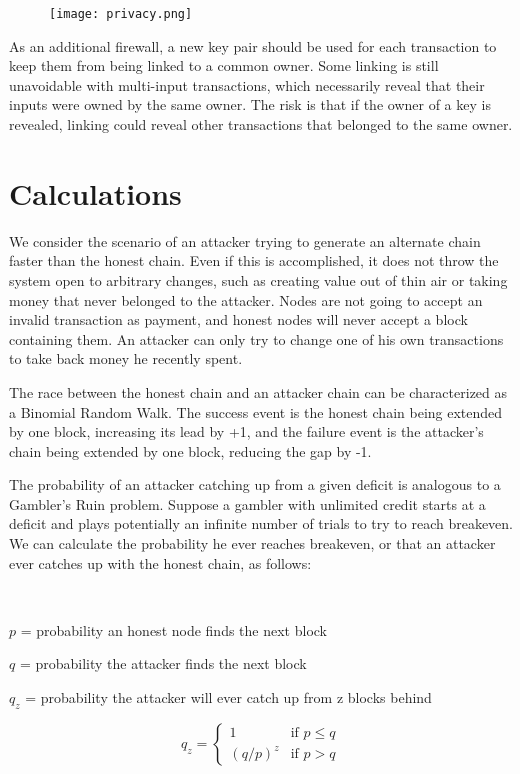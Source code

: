 \documentclass[a4paper, 10pt]{article}
\begin{document}
\begin{figure}[!h]
\centering
\texttt{[image: privacy.png]}
\end{figure}

As an additional firewall, a new key pair should be used for each
transaction to keep them from being linked to a common owner. Some
linking is still unavoidable with multi-input transactions, which
necessarily reveal that their inputs were owned by the same owner. The
risk is that if the owner of a key is revealed, linking could reveal
other transactions that belonged to the same owner.

\section{Calculations}\label{calculations}

We consider the scenario of an attacker trying to generate an alternate
chain faster than the honest chain. Even if this is accomplished, it
does not throw the system open to arbitrary changes, such as creating
value out of thin air or taking money that never belonged to the
attacker. Nodes are not going to accept an invalid transaction as
payment, and honest nodes will never accept a block containing them. An
attacker can only try to change one of his own transactions to take back
money he recently spent.

The race between the honest chain and an attacker chain can be
characterized as a Binomial Random Walk. The success event is the honest
chain being extended by one block, increasing its lead by +1, and the
failure event is the attacker's chain being extended by one block,
reducing the gap by -1.

The probability of an attacker catching up from a given deficit is
analogous to a Gambler's Ruin problem. Suppose a gambler with unlimited
credit starts at a deficit and plays potentially an infinite number of
trials to try to reach breakeven. We can calculate the probability he
ever reaches breakeven, or that an attacker ever catches up with the
honest chain, as follows\cite{fel57}:

\

\(p\) = {\small probability an honest node finds the next block}

\(q\) = {\small probability the attacker finds the next block}

\(q_z\) = {\small probability the attacker will ever catch up from z blocks behind}

\[
    q_z = 
\begin{cases}
    1               & \text{if } p \leqslant q\\
    \left(q/p\right)^z & \text{if } p > q
\end{cases}
\]
\end{document}
